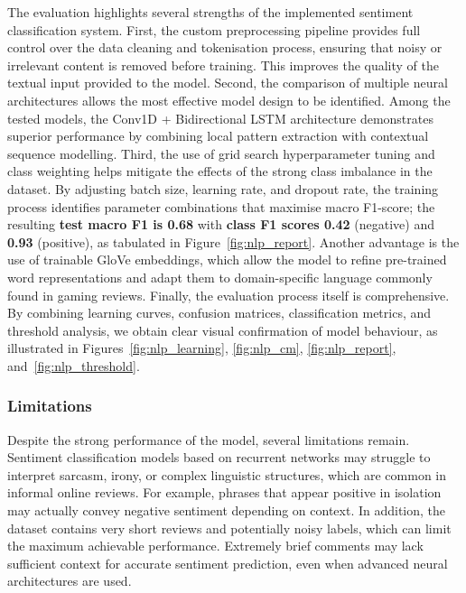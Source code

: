 \documentclass[12pt,a4paper]{article}
\begin{document}
The evaluation highlights several strengths of the implemented sentiment classification system. First, the custom preprocessing pipeline provides full control over the data cleaning and tokenisation process, ensuring that noisy or irrelevant content is removed before training. This improves the quality of the textual input provided to the model. Second, the comparison of multiple neural architectures allows the most effective model design to be identified. Among the tested models, the Conv1D + Bidirectional LSTM architecture demonstrates superior performance by combining local pattern extraction with contextual sequence modelling. Third, the use of grid search hyperparameter tuning and class weighting helps mitigate the effects of the strong class imbalance in the dataset. By adjusting batch size, learning rate, and dropout rate, the training process identifies parameter combinations that maximise macro F1-score; the resulting \textbf{test macro F1 is 0.68} with \textbf{class F1 scores 0.42} (negative) and \textbf{0.93} (positive), as tabulated in Figure~\ref{fig:nlp_report}. Another advantage is the use of trainable GloVe embeddings, which allow the model to refine pre-trained word representations and adapt them to domain-specific language commonly found in gaming reviews. Finally, the evaluation process itself is comprehensive. By combining learning curves, confusion matrices, classification metrics, and threshold analysis, we obtain clear visual confirmation of model behaviour, as illustrated in Figures~\ref{fig:nlp_learning}, \ref{fig:nlp_cm}, \ref{fig:nlp_report}, and~\ref{fig:nlp_threshold}.

\subsubsection{Limitations}

Despite the strong performance of the model, several limitations remain. Sentiment classification models based on recurrent networks may struggle to interpret sarcasm, irony, or complex linguistic structures, which are common in informal online reviews. For example, phrases that appear positive in isolation may actually convey negative sentiment depending on context. In addition, the dataset contains very short reviews and potentially noisy labels, which can limit the maximum achievable performance. Extremely brief comments may lack sufficient context for accurate sentiment prediction, even when advanced neural architectures are used.
\end{document}
